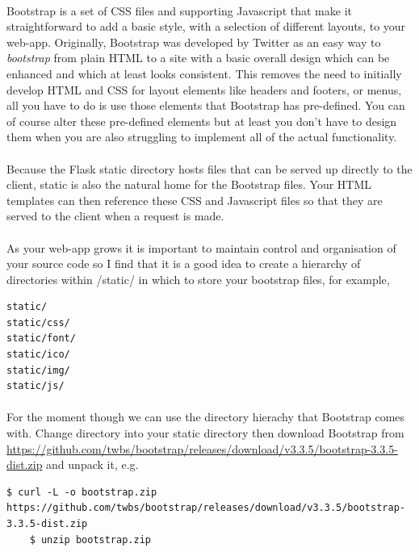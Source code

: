 \documentclass[12pt, a4paper, oneside]{book}
\begin{document}
\paragraph{} Bootstrap is a set of CSS files and supporting Javascript that make it straightforward to add a basic style, with a selection of different layouts, to your web-app. Originally, Bootstrap was developed by Twitter as an easy way to \emph{bootstrap} from plain HTML to a site with a basic overall design which can be enhanced and which at least looks consistent. This removes the need to initially develop HTML and CSS for layout elements like headers and footers, or menus, all you have to do is use those elements that Bootstrap has pre-defined. You can of course alter these pre-defined elements but at least you don't have to design them when you are also struggling to implement all of the actual functionality.

\paragraph{} Because the Flask static directory hosts files that can be served up directly to the client, static is also the natural home for the Bootstrap files. Your HTML templates can then reference these CSS and Javascript files so that they are served to the client when a request is made.

\paragraph{} As your web-app grows it is important to maintain control and organisation of your source code so I find that it is a good idea to create a hierarchy of directories within /static/ in which to store your bootstrap files, for example,

\begin{lstlisting}[style=DOS]
static/
static/css/
static/font/
static/ico/
static/img/
static/js/
\end{lstlisting}

\paragraph{} For the moment though we can use the directory hierachy that Bootstrap comes with. Change directory into your static directory  then download Bootstrap from \url{https://github.com/twbs/bootstrap/releases/download/v3.3.5/bootstrap-3.3.5-dist.zip} and unpack it, e.g.

\begin{lstlisting}[style=DOS]
    $ curl -L -o bootstrap.zip https://github.com/twbs/bootstrap/releases/download/v3.3.5/bootstrap-3.3.5-dist.zip
    $ unzip bootstrap.zip
\end{lstlisting}
\end{document}
